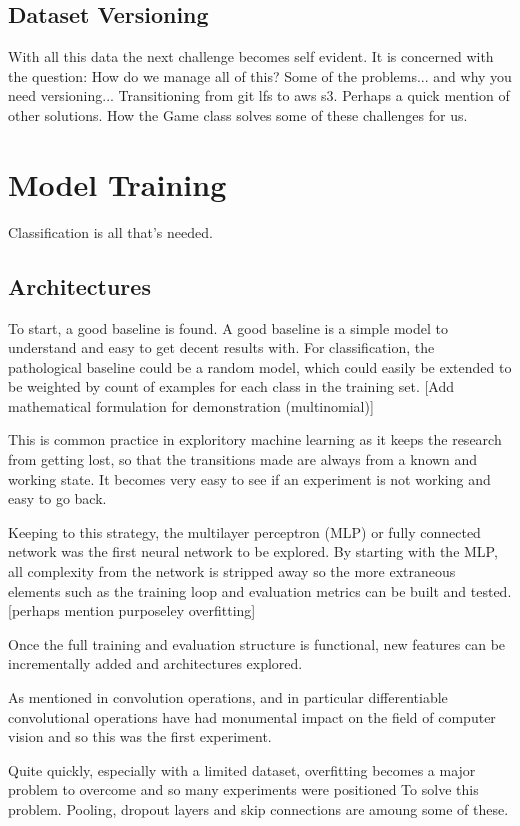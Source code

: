 \subsection{Dataset Versioning}
With all this data the next challenge becomes self evident.
It is concerned with the question: How do we manage all of this?
Some of the problems... and why you need versioning...
Transitioning from git lfs to aws s3.  Perhaps a quick mention of other solutions.
How the Game class solves some of these challenges for us.


\section{Model Training}
Classification is all that's needed.  

\subsection{Architectures}
To start, a good baseline is found.  A good baseline is a simple model to understand and easy to get decent results with.
For classification, the pathological baseline could be a random model, which could easily be extended to be weighted by 
count of examples for each class in the training set.  [Add mathematical formulation for demonstration (multinomial)]

This is common practice in exploritory \cite{} machine learning as it keeps the research from getting lost, so that the transitions
made are always from a known and working state.  It becomes very easy to see if an experiment is not working and easy to go back.

Keeping to this strategy, the multilayer perceptron (MLP) or fully connected network \cite{} was the first neural network to be explored.
By starting with the MLP, all complexity from the network is stripped away so the more extraneous elements such as the training loop and 
evaluation metrics can be built and tested.  [perhaps mention purposeley overfitting]

Once the full training and evaluation structure is functional, new features can be incrementally added and architectures explored.

As mentioned in  convolution operations, and in particular differentiable convolutional operations have had monumental 
impact on the field of computer vision and so this was the first experiment.

Quite quickly, especially with a limited dataset, overfitting becomes a major problem to overcome and so many experiments were positioned To
solve this problem.  Pooling, dropout layers and skip connections are amoung some of these.

